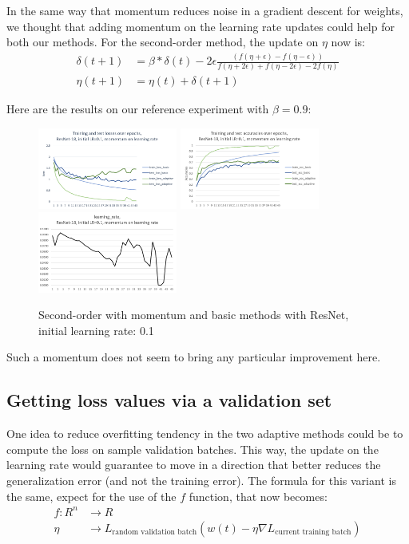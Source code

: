 \documentclass{article}
\begin{document}
  In the same way that momentum reduces noise in a gradient descent for weights, we thought that adding momentum on the learning rate updates could help for both our methods. For the second-order method, the update on $\eta$ now is:\\
  \begin{align}
  \delta(t+1) &= \beta*\delta(t) - 2\epsilon\frac{(f(\eta+\epsilon)-f(\eta-\epsilon))}{f(\eta+2\epsilon)+f(\eta-2\epsilon)-2f(\eta)}\\
  \eta(t+1) &= \eta(t) + \delta(t+1)
  \end{align}
  
  Here are the results on our reference experiment with $\beta=0.9$:\\
  
  \begin{figure}[!h]
  	\includegraphics[width=130pt]{loss_resnet_mom_lr_0_1.png}
  	\includegraphics[width=130pt]{acc_resnet_mom_lr_0_1.png}
  	\includegraphics[width=130pt]{lr_resnet_mom_lr_0_1.png}
  	\caption{Second-order with momentum and basic methods with ResNet, initial learning rate: 0.1}
  \end{figure}

  Such a momentum does not seem to bring any particular improvement here. 
  
  \subsection{Getting loss values via a validation set}
  
  One idea to reduce overfitting tendency in the two adaptive methods could be to compute the loss on sample validation batches. This way, the update on the learning rate would guarantee to move in a direction that better reduces the generalization error (and not the training error). The formula for this variant is the same, expect for the use of the $f$ function, that now becomes:\\
  \begin{align}
  f : R^{n} &\rightarrow R\\
  \eta &\rightarrow L_{\text{random validation batch}}(w(t)-\eta \nabla L_{\text{current training batch}})
  \end{align}
  
\end{document}
